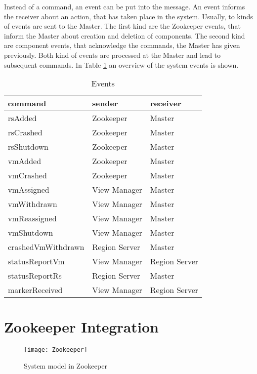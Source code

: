 \documentclass[11pt,a4paper,bibtotoc,idxtotoc,headsepline,footsepline,footexclude,BCOR12mm,DIV13]{scrbook}
\begin{document}
Instead of a command, an event can be put into the message. An event informs the receiver about an action, that has taken place in the system. Usually, to kinds of events are sent to the Master. The first kind are the Zookeeper events, that inform the Master about creation and deletion of components. The second kind are component events, that acknowledge the commands, the Master has given previously. Both kind of events are processed at the Master and lead to subsequent commands. In Table \ref{tab:events} an overview of the system events is shown.




\begin{table}[h!]
\begin{center}
\begin{tabular}{ l l l}
  command & sender & receiver \\  \hline
  rsAdded & Zookeeper & Master \\
  rsCrashed & Zookeeper & Master \\
  rsShutdown & Zookeeper & Master \\
  vmAdded & Zookeeper & Master \\
  vmCrashed & Zookeeper & Master \\
  vmAssigned & View Manager & Master \\
  vmWithdrawn & View Manager & Master \\
  vmReassigned & View Manager & Master \\
  vmShutdown & View Manager & Master \\
  crashedVmWithdrawn & Region Server & Master \\
  statusReportVm & View Manager & Region Server \\
  statusReportRs & Region Server & Master \\
  markerReceived & View Manager & Region Server \\
\end{tabular}
\end{center}
\caption{Events}
\label{tab:events}
\end{table}


\section{Zookeeper Integration}

\begin{figure}[h!]
  
  \centering
    \texttt{[image: Zookeeper]}
    \caption{System model in Zookeeper}
    \label{fig:zookeeper}
\end{figure}
\end{document}
